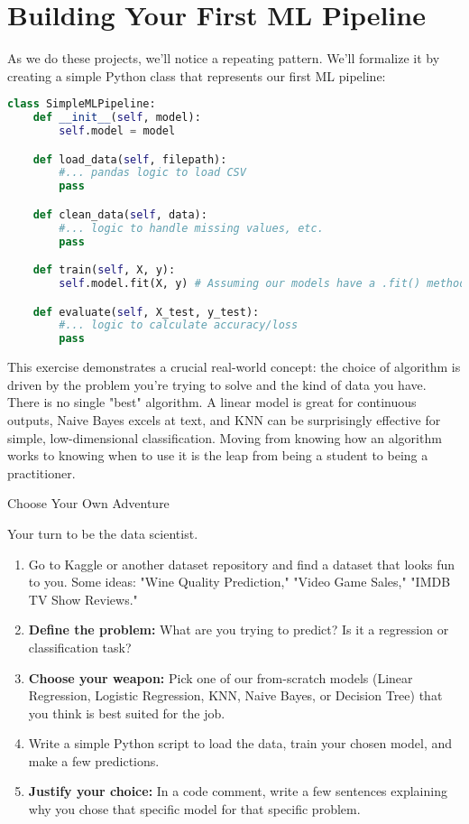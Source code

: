 \documentclass[11pt, letterpaper, openany]{book}
\begin{document}
\section{Building Your First ML Pipeline}

As we do these projects, we'll notice a repeating pattern. We'll formalize it by creating a simple Python class that represents our first ML pipeline:

\begin{lstlisting}[language=Python]
class SimpleMLPipeline:
    def __init__(self, model):
        self.model = model

    def load_data(self, filepath):
        #... pandas logic to load CSV
        pass

    def clean_data(self, data):
        #... logic to handle missing values, etc.
        pass

    def train(self, X, y):
        self.model.fit(X, y) # Assuming our models have a .fit() method

    def evaluate(self, X_test, y_test):
        #... logic to calculate accuracy/loss
        pass
\end{lstlisting}

This exercise demonstrates a crucial real-world concept: the choice of algorithm is driven by the problem you're trying to solve and the kind of data you have. There is no single "best" algorithm. A linear model is great for continuous outputs, Naive Bayes excels at text, and KNN can be surprisingly effective for simple, low-dimensional classification. Moving from knowing how an algorithm works to knowing when to use it is the leap from being a student to being a practitioner.

\begin{challengebox}
Choose Your Own Adventure

Your turn to be the data scientist.
\begin{enumerate}
    \item Go to Kaggle or another dataset repository and find a dataset that looks fun to you. Some ideas: "Wine Quality Prediction," "Video Game Sales," "IMDB TV Show Reviews."
    \item \textbf{Define the problem:} What are you trying to predict? Is it a regression or classification task?
    \item \textbf{Choose your weapon:} Pick one of our from-scratch models (Linear Regression, Logistic Regression, KNN, Naive Bayes, or Decision Tree) that you think is best suited for the job.
    \item Write a simple Python script to load the data, train your chosen model, and make a few predictions.
    \item \textbf{Justify your choice:} In a code comment, write a few sentences explaining why you chose that specific model for that specific problem.
\end{enumerate}
\end{challengebox}
\end{document}
